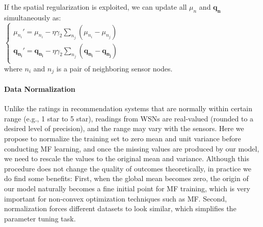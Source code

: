 If the spatial regularization is exploited, we can update all $\mu_n$ and $\mathbf{q_n}$ simultaneously as:\\
\indent $\begin{cases}
	\mu_{n_i}' = \mu_{n_i} - \eta \gamma_2 \sum_{n_j}{(\mu_{n_i} - \mu_{n_j})}\\
	\mathbf{q_{n_i}}' = \mathbf{q_{n_i}} - \eta \gamma_2 \sum_{n_j}{(\mathbf{q_{n_i}} - \mathbf{q_{n_j}})}\\
	\end{cases}$\\
where $n_i$ and $n_j$ is a pair of neighboring sensor nodes.

\paragraph*{Data Normalization}
Unlike the ratings in recommendation systems that are normally within certain range (e.g., 1 star to 5 star), readings from WSNs are real-valued (rounded to a desired level of precision), and the range may vary with the sensors.
Here we propose to normalize the training set to zero mean and unit variance before conducting MF learning, and once the missing values are produced by our model, we need to rescale the values to the original mean and variance.
Although this procedure does not change the quality of outcomes theoretically, in practice we do find some benefits: 
First, when the global mean becomes zero, the origin of our model naturally becomes a fine initial point for MF training, which is very important for non-convex optimization techniques such as MF.
Second, normalization forces different datasets to look similar, which simplifies the parameter tuning task. 


